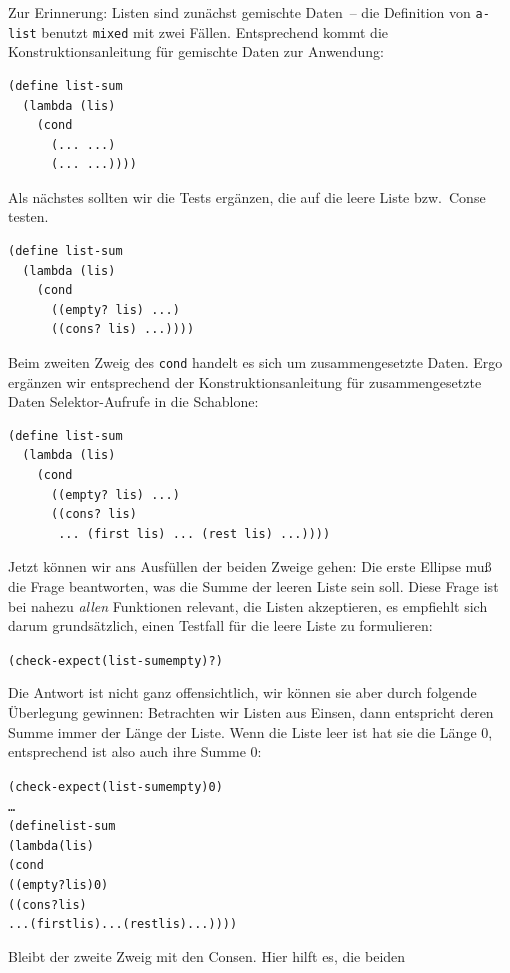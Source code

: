 Zur Erinnerung: Listen sind zunächst gemischte Daten~-- die Definition
von \texttt{a-list} benutzt \texttt{mixed} mit zwei Fällen.  Entsprechend kommt die
Konstruktionsanleitung für gemischte Daten zur Anwendung:
%
\begin{verbatim}
(define list-sum
  (lambda (lis)
    (cond
      (... ...)
      (... ...))))
\end{verbatim}
%
Als nächstes sollten wir die Tests ergänzen, die auf die leere
Liste bzw.\ Conse testen.  %
%
\begin{verbatim}
(define list-sum
  (lambda (lis)
    (cond
      ((empty? lis) ...)
      ((cons? lis) ...))))
\end{verbatim}
%
Beim zweiten Zweig des \texttt{cond} handelt es sich um
zusammengesetzte Daten. Ergo ergänzen wir entsprechend der
Konstruktionsanleitung für zusammengesetzte Daten Selektor-Aufrufe in
die Schablone:
%
\begin{verbatim}
(define list-sum
  (lambda (lis)
    (cond
      ((empty? lis) ...)
      ((cons? lis)
       ... (first lis) ... (rest lis) ...))))
\end{verbatim}
%
Jetzt können wir ans Ausfüllen der beiden Zweige gehen: Die erste
Ellipse muß die Frage beantworten, was die Summe der leeren Liste sein
soll.  Diese Frage ist bei nahezu \emph{allen} Funktionen relevant,
die Listen akzeptieren, es empfiehlt sich darum grundsätzlich, einen
Testfall für die leere Liste zu formulieren:
%
\begin{alltt}
(check-expect (list-sum empty) \textrm{?})
\end{alltt}
%
Die Antwort ist nicht ganz offensichtlich, wir können 
sie aber durch folgende Überlegung gewinnen: Betrachten wir Listen aus
Einsen, dann entspricht deren Summe immer der Länge der Liste.  Wenn
die Liste leer ist hat sie die Länge $0$, entsprechend ist also auch
ihre Summe $0$:
%
\begin{alltt}
(check-expect (list-sum empty) 0)
\ldots
(define list-sum
  (lambda (lis)
    (cond
      ((empty? lis) 0)
      ((cons? lis)
       ... (first lis) ... (rest lis) ...))))
\end{alltt}
%
Bleibt der zweite Zweig mit den Consen.  Hier hilft es, die beiden
